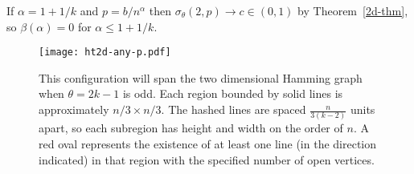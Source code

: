 \begin{remark} If $\alpha = 1+1/k$ and $p = b/n^\alpha$ then $\sigma_\theta(2,p) \to c \in(0,1)$ by Theorem~\ref{2d-thm}, so $\beta(\alpha) = 0$ for $\alpha \leq 1+1/k$.
\end{remark}

\begin{figure}[htd]
	\centering
	\texttt{[image: ht2d-any-p.pdf]}
	\caption{This configuration will span the two dimensional Hamming graph when $\theta = 2k-1$ is odd.  Each region bounded by solid lines is approximately $n/3 \times n/3$.  The hashed lines are spaced $\frac{n}{3(k-2)}$ units apart, so each subregion has height and width on the order of $n$.  A red oval represents the existence of at least one line (in the direction indicated) in that region with the specified number of open vertices.}
	\label{ht2d-any-p}
\end{figure}

